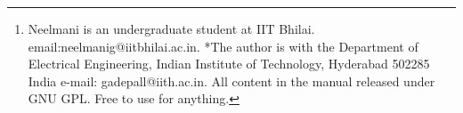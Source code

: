\documentclass[journal,12pt,twocolumn]{IEEEtran}
\begin{document}
\author{Neelmani Gautam and G V V Sharma$^{*}$ %
\thanks{Neelmani is an undergraduate student at IIT Bhilai. email:neelmanig@iitbhilai.ac.in.  *The author is with the Department
of Electrical Engineering, Indian Institute of Technology, Hyderabad
502285 India e-mail:  gadepall@iith.ac.in. All content in the manual released under GNU GPL.  Free to use for anything.}%
}
% 
%



% 




\end{document}
